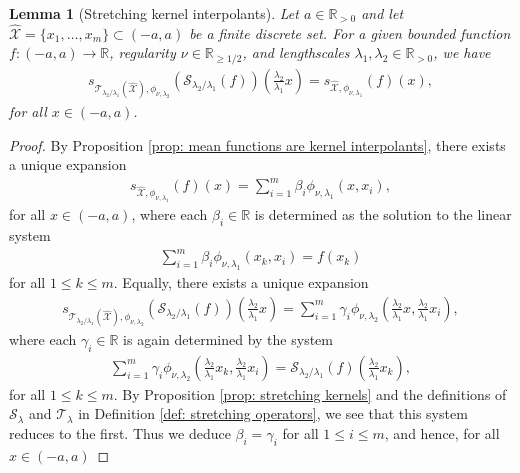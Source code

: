 \documentclass[pdflatex,sn-mathphys-num]{sn-jnl}%
\theoremstyle{thmstyleone}%
\newtheorem{lemma}{Lemma}%
\theoremstyle{thmstyletwo}%
\theoremstyle{thmstylethree}%
\begin{document}
\begin{lemma}[Stretching kernel interpolants]\label{lem: stretch}
    Let \(a\in\mathbb{R}_{>0}\) and let \(\widehat{\mathcal{X}}=\{x_1,\dots,x_m\}\subset(-a,a)\) be a finite discrete set. For a given bounded function \(f:(-a,a)\rightarrow\mathbb{R}\), regularity \(\nu\in\mathbb{R}_{\geq1/2}\), and lengthscales \(\lambda_1,\lambda_2\in\mathbb{R}_{>0}\), we have
    \begin{align}
        s_{\mathcal{T}_{\lambda_2/\lambda_1}(\widehat{\mathcal{X}}),\phi_{\nu,\lambda_2}}(\mathcal{S}_{\lambda_2/\lambda_1}(f))\left(\frac{\lambda_2}{\lambda_1}x\right)=s_{\widehat{\mathcal{X}},\phi_{\nu,\lambda_1}}(f)(x),\nonumber
    \end{align}
    for all \(x\in(-a,a)\).
\end{lemma}
\begin{proof}
    By Proposition \ref{prop: mean functions are kernel interpolants}, there exists a unique expansion 
    \begin{align}
        s_{\widehat{\mathcal{X}},\phi_{\nu,\lambda_1}}(f)(x)=\sum_{i=1}^m\beta_i\phi_{\nu,\lambda_1}(x,x_i),\nonumber
    \end{align}
    for all \(x\in(-a,a)\), where each \(\beta_i\in\mathbb{R}\) is determined as the solution to the linear system
    \begin{align}
        \sum_{i=1}^m\beta_i\phi_{\nu,\lambda_1}(x_k,x_i) = f(x_k)\label{eq: linear system}
    \end{align}
    for all \(1\leq k \leq m\). Equally, there exists a unique expansion 
    \begin{align}
        s_{\mathcal{T}_{\lambda_2/\lambda_1}(\widehat{\mathcal{X}}),\phi_{\nu,\lambda_2}}(\mathcal{S}_{\lambda_2/\lambda_1}(f))\left(\frac{\lambda_2}{\lambda_1}x\right)=\sum_{i=1}^{m}\gamma_i\phi_{\nu,\lambda_2}\left(\frac{\lambda_2}{\lambda_1}x,\frac{\lambda_2}{\lambda_1}x_i\right),\nonumber
    \end{align}
    where each \(\gamma_i\in\mathbb{R}\) is again determined by the system
    \begin{align}
        \sum_{i=1}^m\gamma_i\phi_{\nu,\lambda_2}\left(\frac{\lambda_2}{\lambda_1}x_k,\frac{\lambda_2}{\lambda_1}x_i\right) = \mathcal{S}_{\lambda_2/\lambda_1}(f)\left(\frac{\lambda_2}{\lambda_1}x_k\right),\nonumber
    \end{align}
    for all \(1\leq k \leq m\). By Proposition \ref{prop: stretching kernels} and the definitions of \(\mathcal{S}_{\lambda}\) and \(\mathcal{T}_{\lambda}\) in Definition \ref{def: stretching operators}, we see that this system reduces to the first. Thus we deduce \(\beta_i=\gamma_i\) for all \(1\leq i \leq m\), and hence, for all \(x\in(-a,a)\)


\end{proof}
\end{document}
